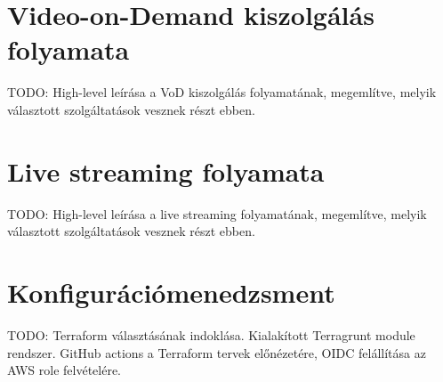 \section{Video-on-Demand kiszolgálás folyamata}

TODO: High-level leírása a VoD kiszolgálás folyamatának, megemlítve, melyik választott szolgáltatások vesznek részt ebben.

\section{Live streaming folyamata}

TODO: High-level leírása a live streaming folyamatának, megemlítve, melyik választott szolgáltatások vesznek részt ebben.

\section{Konfigurációmenedzsment}

TODO: Terraform választásának indoklása. Kialakított Terragrunt module rendszer. GitHub actions a Terraform tervek előnézetére, OIDC felállítása az AWS role felvételére.
